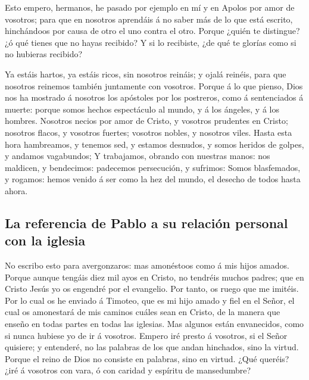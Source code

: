  Esto empero, hermanos, he pasado por ejemplo en mí y en
Apolos por amor de vosotros; para que en nosotros aprendáis á no saber
más de lo que está escrito, hinchándoos por causa de otro el uno contra
el otro.  Porque ¿quién te distingue? ¿ó qué tienes que no
hayas recibido? Y si lo recibiste, ¿de qué te glorías como si no
hubieras recibido?

 Ya estáis hartos, ya estáis ricos, sin nosotros reináis; y
ojalá reinéis, para que nosotros reinemos también juntamente con
vosotros.  Porque á lo que pienso, Dios nos ha mostrado á
nosotros los apóstoles por los postreros, como á sentenciados á muerte:
porque somos hechos espectáculo al mundo, y á los ángeles, y á los
hombres.  Nosotros necios por amor de Cristo, y vosotros
prudentes en Cristo; nosotros flacos, y vosotros fuertes; vosotros
nobles, y nosotros viles.  Hasta esta hora hambreamos, y
tenemos sed, y estamos desnudos, y somos heridos de golpes, y andamos
vagabundos;  Y trabajamos, obrando con nuestras manos: nos
maldicen, y bendecimos: padecemos persecución, y sufrimos: 
Somos blasfemados, y rogamos: hemos venido á ser como la hez del mundo,
el desecho de todos hasta ahora.

\hypertarget{la-referencia-de-pablo-a-su-relaciuxf3n-personal-con-la-iglesia}{%
\subsection{La referencia de Pablo a su relación personal con la
iglesia}\label{la-referencia-de-pablo-a-su-relaciuxf3n-personal-con-la-iglesia}}

 No escribo esto para avergonzaros: mas amonéstoos como á
mis hijos amados.  Porque aunque tengáis diez mil ayos en
Cristo, no tendréis muchos padres; que en Cristo Jesús yo os engendré
por el evangelio.  Por tanto, os ruego que me imitéis.
 Por lo cual os he enviado á Timoteo, que es mi hijo amado
y fiel en el Señor, el cual os amonestará de mis caminos cuáles sean en
Cristo, de la manera que enseño en todas partes en todas las iglesias.
 Mas algunos están envanecidos, como si nunca hubiese yo de
ir á vosotros.  Empero iré presto á vosotros, si el Señor
quisiere; y entenderé, no las palabras de los que andan hinchados, sino
la virtud.  Porque el reino de Dios no consiste en
palabras, sino en virtud.  ¿Qué queréis? ¿iré á vosotros
con vara, ó con caridad y espíritu de mansedumbre?

